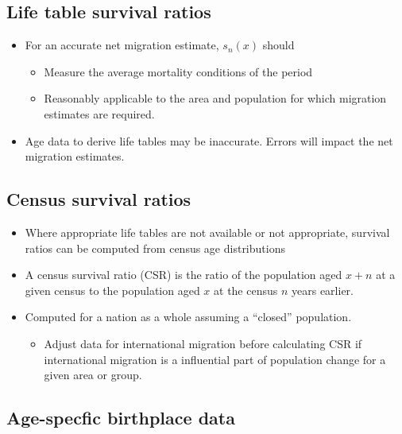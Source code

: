 \documentclass[
]{book}
\providecommand{\tightlist}{%
  \setlength{\itemsep}{0pt}\setlength{\parskip}{0pt}}
\begin{document}
\hypertarget{life-table-survival-ratios}{%
\subsection{Life table survival ratios}\label{life-table-survival-ratios}}

\begin{itemize}
\tightlist
\item
  For an accurate net migration estimate, \(s_n(x)\) should

  \begin{itemize}
  \tightlist
  \item
    Measure the average mortality conditions of the period
  \item
    Reasonably applicable to the area and population for which migration estimates are required.
  \end{itemize}
\item
  Age data to derive life tables may be inaccurate. Errors will impact the net migration estimates.
\end{itemize}

\hypertarget{census-survival-ratios}{%
\subsection{Census survival ratios}\label{census-survival-ratios}}

\begin{itemize}
\tightlist
\item
  Where appropriate life tables are not available or not appropriate, survival ratios can be computed from census age distributions
\item
  A census survival ratio (CSR) is the ratio of the population aged \(x+n\) at a given census to the population aged \(x\) at the census \(n\) years earlier.
\item
  Computed for a nation as a whole assuming a ``closed'' population.

  \begin{itemize}
  \tightlist
  \item
    Adjust data for international migration before calculating CSR if international migration is a influential part of population change for a given area or group.
  \end{itemize}
\end{itemize}

\hypertarget{age-specfic-birthplace-data}{%
\subsection{Age-specfic birthplace data}\label{age-specfic-birthplace-data}}
\end{document}
